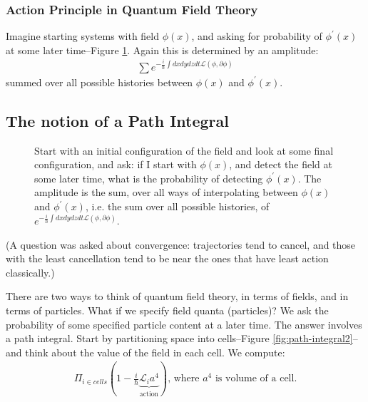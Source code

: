 \documentclass[]{article}
\begin{document}
\subsubsection{Action Principle in Quantum Field Theory}

Imagine starting systems with field $\phi(x)$, and asking for probability of $\phi^\prime(x)$ at some later time--Figure \ref{fig:path-integral1}. Again this is determined by an amplitude:
\begin{align*}
	\sum e^{-\frac{i}{\hslash} \int dx dy dz dt\mathcal{L}(\phi,\partial \phi) }
\end{align*}
summed over all possible histories between $\phi(x)$ and $\phi^\prime(x)$.

\subsection{The notion of a Path Integral}
\begin{figure}[H]
	\begin{center}
		\caption[The notion of a Path Integral]{Start with an initial configuration of the field and look at some final configuration, and ask: if I start with $\phi(x)$, and detect the field at some later time, what is the probability of detecting $\phi^\prime(x)$. The amplitude is the sum, over all ways of interpolating between $\phi(x)$ and $\phi^\prime(x)$, i.e. the sum over all possible histories, of $e^{-\frac{i}{\hslash} \int dx dy dz dt\mathcal{L}(\phi,\partial \phi) }$. }\label{fig:path-integral1}
	\end{center}
\end{figure}

(A question was asked about convergence: trajectories tend to cancel, and those with the least cancellation tend to be near the ones that have least action classically.)

There are two ways to think of quantum field theory, in terms of fields, and in terms of particles. What if we specify field quanta (particles)? We ask the probability of some specified particle content at a later time. The answer involves a path integral. Start by partitioning space into cells--Figure \ref{fig:path-integral2}--and think about the value of the field in each cell. We compute:
\begin{align*}
	\Pi_{i\in cells}(1-\frac{i}{\hslash} \underbrace{\mathcal{L}_i a^4}_\text{action}) \text{, where $a^4$ is volume of a cell.}
\end{align*}
 
\end{document}
